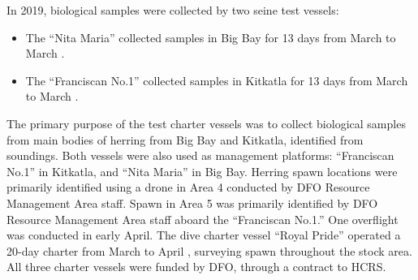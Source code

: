 In 2019, biological samples were collected by two seine test vessels:
\begin{itemize}
\item The ``Nita Maria'' collected samples in Big Bay for 13 days from March  to March .
\item The ``Franciscan No.1'' collected samples in Kitkatla for 13 days from March  to March .
\end{itemize}
The primary purpose of the test charter vessels was to collect biological samples from main bodies of herring from Big Bay and Kitkatla, identiﬁed from soundings.
Both vessels were also used as management platforms: ``Franciscan No.1'' in Kitkatla, and ``Nita Maria'' in Big Bay. 
Herring spawn locations were primarily identiﬁed using a drone in Area 4 conducted by DFO Resource Management Area staff.
Spawn in Area 5 was primarily identified by DFO Resource Management Area staff aboard the ``Franciscan No.1.''
One overflight was conducted in early April.
The dive charter vessel ``Royal Pride'' operated a 20-day charter from March  to April , surveying spawn throughout the stock area.
All three charter vessels were funded by DFO, through a contract to HCRS.